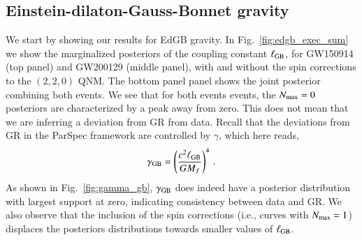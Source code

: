\documentclass[twocolumn,
               prd,
               aps,
               superscriptaddress,
               tightenlines,
               nofootinbib,
               eqsecnum,
               amsfonts,
               amsmath,
               longbibliography]{revtex4-1}
\newcommand{\hs}[1]{{\textcolor{blue}{{[HS: #1]}} }}
\begin{document}



\subsection{Einstein-dilaton-Gauss-Bonnet gravity}
\label{sec:results_edgb}

We start by showing our results for EdGB gravity.
%
In Fig.~\ref{fig:edgb_exec_sum} we show the marginalized posteriors of the
coupling constant $\ell_{\rm GB}$, for GW150914 (top panel) and GW200129
(middle panel), with and without the spin corrections to the $(2,2,0)$ QNM.
%
The bottom panel panel shows the joint posterior combining both events.
%
We see that for both events events, the $N_{\rm max} = 0$ posteriors are
characterized by a peak away from zero.
%
This does not mean that we are inferring a deviation from GR from data.
%
Recall that the deviations from GR in the ParSpec framework are controlled
by $\gamma$, which here reads,
%
\begin{equation}
    \gamma_{\rm GB} = \left(\frac{c^2 \ell_{\rm GB}}{ G M_{f}}\right)^4\,.
    \label{eq:def_gamma_gb}
\end{equation}
%
As shown in Fig.~\ref{fig:gamma_gb}, $\gamma_{\rm GB}$ does indeed have a posterior
distribution with largest support at zero, indicating consistency between data
and GR.
%
We also observe that the inclusion of the spin corrections (i.e., curves with $N_{\rm max} = 1$)
displaces the posteriors distributions towards smaller values of $\ell_{\rm GB}$.
\end{document}
